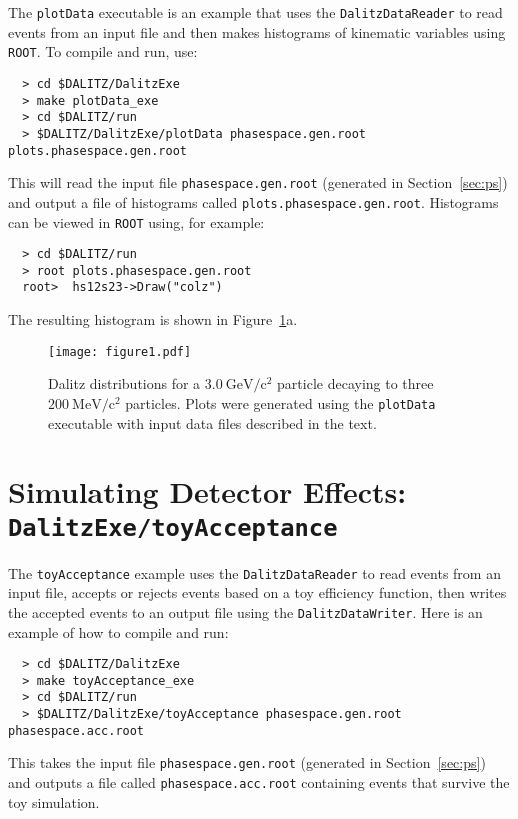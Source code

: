 \documentclass[11pt]{article}
\newcommand{\gevcc}{\mathrm{GeV/c^2}}
\newcommand{\mevcc}{\mathrm{MeV/c^2}}
\begin{document}
The {\tt plotData} executable is an example that uses the {\tt DalitzDataReader} to read events from an input file and then makes histograms of kinematic variables using {\tt ROOT}.  To compile and run, use:
\begin{verbatim}
  > cd $DALITZ/DalitzExe
  > make plotData_exe
  > cd $DALITZ/run
  > $DALITZ/DalitzExe/plotData phasespace.gen.root plots.phasespace.gen.root
\end{verbatim}
This will read the input file {\tt phasespace.gen.root} (generated in Section~\ref{sec:ps}) and output a file of histograms called {\tt plots.phasespace.gen.root}.  Histograms can be viewed in {\tt ROOT} using, for example:
\begin{verbatim}
  > cd $DALITZ/run
  > root plots.phasespace.gen.root
  root>  hs12s23->Draw("colz")
\end{verbatim}
The resulting histogram is shown in Figure~\ref{fig:dalitz}a.

\begin{figure}[h!]
\begin{center}
\texttt{[image: figure1.pdf]}
\caption{Dalitz distributions for a $3.0~\gevcc$ particle decaying to three $200~\mevcc$ particles.  Plots were generated using the {\tt plotData} executable with input data files described in the text.
\label{fig:dalitz}}
\end{center}
\end{figure}


\section{Simulating Detector Effects: \\
{\tt DalitzExe/toyAcceptance}}
\label{sec:eff}

The {\tt toyAcceptance} example uses the {\tt DalitzDataReader} to read events from an input file, accepts or rejects events based on a toy efficiency function, then writes the accepted events to an output file using the {\tt DalitzDataWriter}.  Here is an example of how to compile and run:
\begin{verbatim}
  > cd $DALITZ/DalitzExe
  > make toyAcceptance_exe
  > cd $DALITZ/run
  > $DALITZ/DalitzExe/toyAcceptance phasespace.gen.root phasespace.acc.root
\end{verbatim}
This takes the input file {\tt phasespace.gen.root} (generated in Section~\ref{sec:ps}) and outputs a file called {\tt phasespace.acc.root} containing events that survive the toy simulation.
\end{document}
